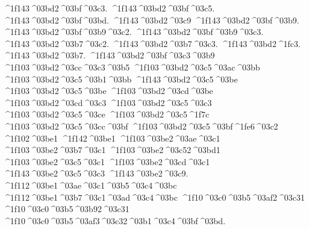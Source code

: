 {	^^^^1f143^^^^03bd2^^^^03bf^^^^03c3.
	^^^^1f143^^^^03bd2^^^^03bf^^^^03c5.
	^^^^1f143^^^^03bd2^^^^03bf^^^^03bd.
	^^^^1f143^^^^03bd2^^^^03c9
	^^^^1f143^^^^03bd2^^^^03bf^^^^03b9.
	^^^^1f143^^^^03bd2^^^^03bf^^^^03b9^^^^03c2.
	^^^^1f143^^^^03bd2^^^^03bf^^^^03b9^^^^03c3.
	^^^^1f143^^^^03bd2^^^^03b7^^^^03c2.
	^^^^1f143^^^^03bd2^^^^03b7^^^^03c3.
	^^^^1f143^^^^03bd2^^^^1fc3.
 	^^^^1f143^^^^03bd2^^^^03b7.
	^^^^1f143^^^^03bd2^^^^03bf^^^^03c3^^^^03b9		%
	^^^^1f103^^^^03bd2^^^^03cc^^^^03c3^^^^03b5
	^^^^1f103^^^^03bd2^^^^03c5^^^^03ac^^^^03bb  		%
	^^^^1f103^^^^03bd2^^^^03c5^^^^03b1^^^^03bb
	^^^^1f143^^^^03bd2^^^^03c5^^^^03be    		%
	^^^^1f103^^^^03bd2^^^^03c5^^^^03be 		%
	^^^^1f103^^^^03bd2^^^^03cd^^^^03be		%
	^^^^1f103^^^^03bd2^^^^03cd^^^^03c3    		%
	^^^^1f103^^^^03bd2^^^^03c5^^^^03c3
	^^^^1f103^^^^03bd2^^^^03c5^^^^03ce    		%
	^^^^1f103^^^^03bd2^^^^03c5^^^^1f7c
	^^^^1f103^^^^03bd2^^^^03c5^^^^03cc^^^^03bf
	^^^^1f103^^^^03bd2^^^^03c5^^^^03bf^^^^1fe6^^^^03c2
^^^^1f102^^^^03be1
^^^^1f142^^^^03be1
	^^^^1f103^^^^03be2^^^^03ae^^^^03c1   		%
	^^^^1f103^^^^03be2^^^^03b7^^^^03c1 		%
	^^^^1f103^^^^03be2^^^^03c52^^^^03bd1   		%
	^^^^1f103^^^^03be2^^^^03c5^^^^03c1     		%
	^^^^1f103^^^^03be2^^^^03cd^^^^03c1  		%
	^^^^1f143^^^^03be2^^^^03c5^^^^03c3  		%
	^^^^1f143^^^^03be2^^^^03c9.
^^^^1f112^^^^03be1^^^^03ae^^^^03c1^^^^03b5^^^^03c4^^^^03bc		%
^^^^1f112^^^^03be1^^^^03b7^^^^03c1^^^^03ad^^^^03c4^^^^03bc
^^^^1f10^^^^03c0^^^^03b5^^^^03af2^^^^03c31 		%
^^^^1f10^^^^03c0^^^^03b5^^^^03b92^^^^03c31
	^^^^1f10^^^^03c0^^^^03b5^^^^03af3^^^^03c32^^^^03b1^^^^03c4^^^^03bf^^^^03bd.	%
}
